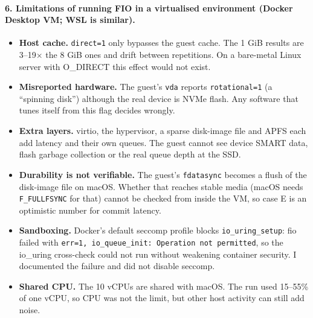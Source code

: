 \documentclass[11pt,a4paper]{article}
\begin{document}
\paragraph{6. Limitations of running FIO in a virtualised environment (Docker Desktop VM; WSL is similar).}
\begin{itemize}
  \item \textbf{Host cache.} \texttt{direct=1} only bypasses the guest cache. The 1 GiB results are 3--19$\times$
    the 8 GiB ones and drift between repetitions. On a bare-metal Linux server with O\_DIRECT this effect would not exist.
  \item \textbf{Misreported hardware.} The guest's \texttt{vda} reports \texttt{rotational=1} (a ``spinning disk'')
    although the real device is NVMe flash. Any software that tunes itself from this flag decides wrongly.
  \item \textbf{Extra layers.} virtio, the hypervisor, a sparse disk-image file and APFS each add latency and
    their own queues. The guest cannot see device SMART data, flash garbage collection or the real queue depth at the SSD.
  \item \textbf{Durability is not verifiable.} The guest's \texttt{fdatasync} becomes a flush of the
    disk-image file on macOS. Whether that reaches stable media (macOS needs \texttt{F\_FULLFSYNC} for that) cannot
    be checked from inside the VM, so case E is an optimistic number for commit latency.
  \item \textbf{Sandboxing.} Docker's default seccomp profile blocks \texttt{io\_uring\_setup}: fio failed with
    \texttt{err=1, io\_queue\_init: Operation not permitted}, so the io\_uring cross-check could not run without
    weakening container security. I documented the failure and did not disable seccomp.
  \item \textbf{Shared CPU.} The 10 vCPUs are shared with macOS. The run used 15--55\% of one vCPU, so CPU was not the
    limit, but other host activity can still add noise.
\end{itemize}
\end{document}
